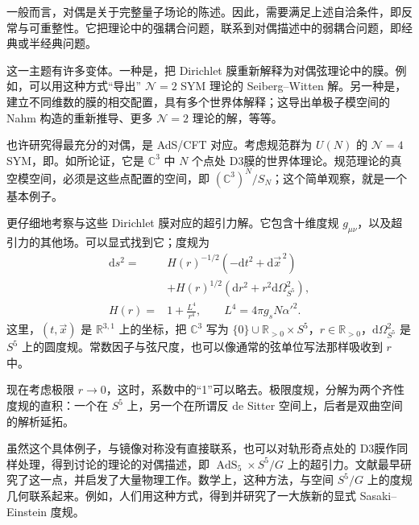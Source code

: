一般而言，对偶是关于完整量子场论的陈述。因此，需要满足上述自洽条件，即反常与可重整性。它把理论中的强耦合问题，联系到对偶描述中的弱耦合问题，即经典或半经典问题。

这一主题有许多变体。一种是，把 Dirichlet 膜重新解释为对偶弦理论中的膜。例如，可以用这种方式“导出” $\mathcal{N}=2$ SYM 理论的 Seiberg--Witten 解。另一种是，建立不同维数的膜的相交配置，具有多个世界体解释；这导出单极子模空间的 Nahm 构造的重新推导、更多 $\mathcal{N}=2$ 理论的解，等等。

也许研究得最充分的对偶，是 AdS/CFT 对应。考虑规范群为 $U(N)$ 的 $\mathcal{N}=4$ SYM，即。如所论证，它是 $\mathbb{C}^3$ 中 $N$ 个点处 D3膜的世界体理论。规范理论的真空模空间，必须是这些点配置的空间，即 $(\mathbb{C}^3)^N/S_N$；这个简单观察，就是一个基本例子。

更仔细地考察与这些 Dirichlet 膜对应的超引力解。它包含十维度规 $g_{\mu\nu}$，以及超引力的其他场。可以显式找到它；度规为
\[
\begin{aligned}
\mathrm{d}s^2={}&H(r)^{-1/2}(-\mathrm{d}t^2+\mathrm{d}\vec x^{\,2})\\
&+H(r)^{1/2}(\mathrm{d}r^2+r^2\mathrm{d}\Omega_{S^5}^2),\\
H(r)={}&1+\frac{L^4}{r^4},\qquad L^4=4\pi g_sN\alpha'^2.
\end{aligned}
\]
这里，$(t,\vec x)$ 是 $\mathbb{R}^{3,1}$ 上的坐标，把 $\mathbb{C}^3$ 写为 $\{0\}\cup\mathbb{R}_{>0}\times S^5$，$r\in\mathbb{R}_{>0}$，$\mathrm{d}\Omega_{S^5}^2$ 是 $S^5$ 上的圆度规。常数因子与弦尺度，也可以像通常的弦单位写法那样吸收到 $r$ 中。

现在考虑极限 $r\to0$，这时，系数中的“1”可以略去。极限度规，分解为两个齐性度规的直积：一个在 $S^5$ 上，另一个在所谓反 de Sitter 空间上，后者是双曲空间的解析延拓。

虽然这个具体例子，与镜像对称没有直接联系，也可以对轨形奇点处的 D3膜作同样处理，得到讨论的理论的对偶描述，即 $\operatorname{AdS}_5\times S^5/G$ 上的超引力。文献最早研究了这一点，并启发了大量物理工作。数学上，这种方法，与空间 $S^5/G$ 上的度规几何联系起来。例如，人们用这种方式，得到并研究了一大族新的显式 Sasaki--Einstein 度规。


